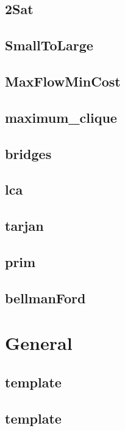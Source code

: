 \subsection{2Sat}
\raggedbottom
\hrulefill
\subsection{SmallToLarge}
\raggedbottom
\hrulefill
\subsection{MaxFlowMinCost}
\raggedbottom
\hrulefill
\subsection{maximum_clique}
\raggedbottom
\hrulefill
\subsection{bridges}
\raggedbottom
\hrulefill
\subsection{lca}
\raggedbottom
\hrulefill
\subsection{tarjan}
\raggedbottom
\hrulefill
\subsection{prim}
\raggedbottom
\hrulefill
\subsection{bellmanFord}
\raggedbottom
\hrulefill

\section{General}
\subsection{template}
\raggedbottom
\hrulefill
\subsection{template}
\raggedbottom
\hrulefill

